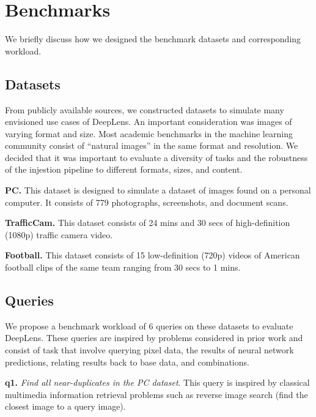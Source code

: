 \section{Benchmarks}
We briefly discuss how we designed the benchmark datasets and corresponding workload.

\subsection{Datasets}
From publicly available sources, we constructed datasets to simulate many envisioned use cases of \textsf{DeepLens}. An important consideration was images of varying format and size. Most academic benchmarks in the machine learning community consist of ``natural images'' in the same format and resolution. We decided that it was important to evaluate a diversity of tasks and the robustness of the injestion pipeline to different formats, sizes, and content. 

\vspace{0.25em} \noindent \textbf{PC.} This dataset is designed to simulate a dataset of images found on a personal computer. It consists of 779 photographs, screenshots, and document scans. 

\vspace{0.25em} \noindent \textbf{TrafficCam.} This dataset consists of 24 mins and 30 secs of high-definition (1080p) traffic camera video. 

\vspace{0.25em} \noindent \textbf{Football.} This dataset consists of 15 low-definition (720p) videos of American football clips of the same team ranging from 30 secs to 1 mins. 

\subsection{Queries}
We propose a benchmark workload of 6 queries on these datasets to evaluate \textsf{DeepLens}. These queries are inspired by problems considered in prior work and consist of task that involve querying pixel data, the results of neural network predictions, relating results back to base data, and combinations.

\vspace{0.25em} \noindent \textbf{q1.} \emph{Find all near-duplicates in the PC dataset}. This query is inspired by classical multimedia information retrieval problems such as reverse image search (find the closest image to a query image). 

